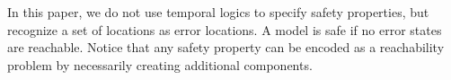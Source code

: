 %
%
%
In this paper, we do not use temporal logics to specify safety properties,
 but recognize a set of locations as error locations.
 A \BIP model is safe if no error states are reachable.
 Notice that any safety property can be encoded as a reachability
 problem by necessarily creating additional components.

